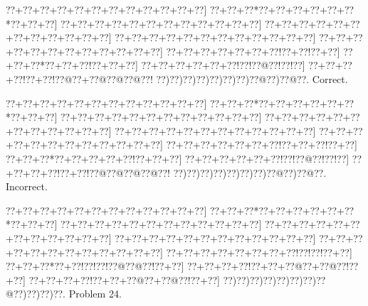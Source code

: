 \documentclass[a5paper]{article}
\begin{document}
\begin{center}
{\goo
\0??+\0??+\0??+\0??+\0??+\0??+\0??+\0??+\0??+\0??+\0??+\0??]
\0??+\0??+\0??*\0??+\0??+\0??+\0??+\0??+\0??*\0??+\0??+\0??]
\0??+\0??+\0??+\0??+\0??+\0??+\0??+\0??+\0??+\0??+\0??+\0??]
\0??+\0??+\0??+\0??+\0??+\0??+\0??+\0??+\0??+\0??+\0??+\0??]
\0??+\0??+\0??+\0??+\0??+\0??+\0??+\0??+\0??+\0??+\0??+\0??]
\0??+\0??+\0??+\0??+\0??+\0??+\0??+\0??+\0??+\0??+\0??+\0??]
\0??+\0??+\0??+\0??+\0??+\0??+\0??!\0??+\0??!\0??+\0??]
\0??+\0??+\0??*\0??+\0??+\0??!\0??+\0??+\0??]
\0??+\0??+\0??+\0??+\0??+\0??!\0??!\0??@\0??!\0??!\0??]
\0??+\0??+\0??+\0??!\0??+\0??!\0??@\0??+\0??@\0??@\0??@\0??!
\0??)\0??)\0??)\0??)\0??)\0??)\0??)\0??@\0??)\0??@\0??.
}
Correct. 

\end{center}
\begin{center}
{\goo
\0??+\0??+\0??+\0??+\0??+\0??+\0??+\0??+\0??+\0??+\0??+\0??]
\0??+\0??+\0??*\0??+\0??+\0??+\0??+\0??+\0??*\0??+\0??+\0??]
\0??+\0??+\0??+\0??+\0??+\0??+\0??+\0??+\0??+\0??+\0??+\0??]
\0??+\0??+\0??+\0??+\0??+\0??+\0??+\0??+\0??+\0??+\0??+\0??]
\0??+\0??+\0??+\0??+\0??+\0??+\0??+\0??+\0??+\0??+\0??+\0??]
\0??+\0??+\0??+\0??+\0??+\0??+\0??+\0??+\0??+\0??+\0??+\0??]
\0??+\0??+\0??+\0??+\0??+\0??+\0??!\0??+\0??+\0??!\0??+\0??]
\0??+\0??+\0??*\0??+\0??+\0??+\0??+\0??!\0??+\0??+\0??]
\0??+\0??+\0??+\0??+\0??+\0??!\0??!\0??@\0??!\0??!\0??]
\0??+\0??+\0??+\0??!\0??+\0??!\0??@\0??@\0??@\0??@\0??!
\0??)\0??)\0??)\0??)\0??)\0??)\0??)\0??@\0??)\0??@\0??.
}
Incorrect. 

\end{center}
\newpage
\begin{center}
{\goo
\0??+\0??+\0??+\0??+\0??+\0??+\0??+\0??+\0??+\0??+\0??+\0??]
\0??+\0??+\0??*\0??+\0??+\0??+\0??+\0??+\0??*\0??+\0??+\0??]
\0??+\0??+\0??+\0??+\0??+\0??+\0??+\0??+\0??+\0??+\0??+\0??]
\0??+\0??+\0??+\0??+\0??+\0??+\0??+\0??+\0??+\0??+\0??+\0??]
\0??+\0??+\0??+\0??+\0??+\0??+\0??+\0??+\0??+\0??+\0??+\0??]
\0??+\0??+\0??+\0??+\0??+\0??+\0??+\0??+\0??+\0??+\0??+\0??]
\0??+\0??+\0??+\0??+\0??+\0??+\0??+\0??!\0??!\0??!\0??+\0??]
\0??+\0??+\0??*\0??+\0??!\0??!\0??!\0??@\0??@\0??!\0??+\0??]
\0??+\0??+\0??+\0??!\0??+\0??+\0??@\0??+\0??@\0??!\0??+\0??]
\0??+\0??+\0??+\0??!\0??+\0??+\0??@\0??+\0??@\0??!\0??+\0??]
\0??)\0??)\0??)\0??)\0??)\0??)\0??)\0??@\0??)\0??)\0??)\0??.
}
Problem 24.

\end{center}
\end{document}
